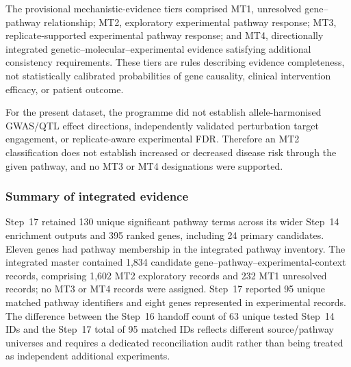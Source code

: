\documentclass[11pt,a4paper]{article}
\begin{document}
The provisional mechanistic-evidence tiers comprised MT1, unresolved gene--pathway relationship; MT2, exploratory experimental pathway response; MT3, replicate-supported experimental pathway response; and MT4, directionally integrated genetic--molecular--experimental evidence satisfying additional consistency requirements. These tiers are rules describing evidence completeness, not statistically calibrated probabilities of gene causality, clinical intervention efficacy, or patient outcome.

For the present dataset, the programme did not establish allele-harmonised GWAS/QTL effect directions, independently validated perturbation target engagement, or replicate-aware experimental FDR. Therefore an MT2 classification does not establish increased or decreased disease risk through the given pathway, and no MT3 or MT4 designations were supported.

\subsubsection{Summary of integrated evidence}\label{subsec:step17_coverage}
Step~17 retained 130 unique significant pathway terms across its wider Step~14 enrichment outputs and 395 ranked genes, including 24 primary candidates. Eleven genes had pathway membership in the integrated pathway inventory. The integrated master contained 1,834 candidate gene--pathway--experimental-context records, comprising 1,602 MT2 exploratory records and 232 MT1 unresolved records; no MT3 or MT4 records were assigned. Step~17 reported 95 unique matched pathway identifiers and eight genes represented in experimental records. The difference between the Step~16 handoff count of 63 unique tested Step~14 IDs and the Step~17 total of 95 matched IDs reflects different source/pathway universes and requires a dedicated reconciliation audit rather than being treated as independent additional experiments.
\end{document}
